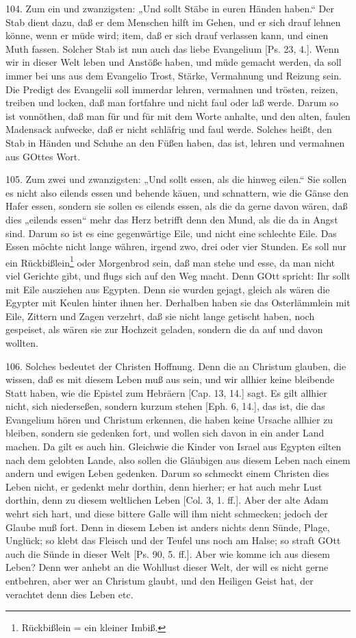 104. Zum ein und zwanzigsten: „Und sollt Stäbe in euren Händen haben.“ Der Stab dient dazu, daß er dem Menschen hilft im Gehen, und er sich drauf lehnen könne, wenn er müde wird; item, daß er sich drauf verlassen kann, und einen Muth fassen. Solcher Stab ist nun auch das liebe Evangelium [Ps. 23, 4.]. Wenn wir in dieser Welt leben und Anstöße haben, und müde gemacht werden, da soll immer bei uns aus dem Evangelio Trost, Stärke, Vermahnung und Reizung sein. Die Predigt des Evangelii soll immerdar lehren, vermahnen und trösten, reizen, treiben und locken, daß man fortfahre und nicht faul oder laß werde. Darum so ist vonnöthen, daß man für und für mit dem Worte anhalte, und den alten, faulen Madensack aufwecke, daß er nicht schläfrig und faul werde. Solches heißt, den Stab in Händen und Schuhe an den Füßen haben, das ist, lehren und vermahnen aus GOttes Wort.

105. Zum zwei und zwanzigsten: „Und sollt essen, als die hinweg eilen.“ Sie sollen es nicht also eilends essen und behende käuen, und schnattern, wie die Gänse den Hafer essen, sondern sie sollen es eilends essen, als die da gerne davon wären, daß dies „eilends essen“ mehr das Herz betrifft denn den Mund, als die da in Angst sind. Darum so ist es eine gegenwärtige Eile, und nicht eine schlechte Eile. Das Essen möchte nicht lange währen, irgend zwo, drei oder vier Stunden. Es soll nur ein Rückbißlein\footnote{Rückbißlein = ein kleiner Imbiß.} oder Morgenbrod sein, daß man stehe und esse, da man nicht viel Gerichte gibt, und flugs sich auf den Weg macht. Denn GOtt spricht: Ihr sollt mit Eile ausziehen aus Egypten. Denn sie wurden gejagt, gleich als wären die Egypter mit Keulen hinter ihnen her. Derhalben haben sie das Osterlämmlein mit Eile, Zittern und Zagen verzehrt, daß sie nicht lange getischt haben, noch gespeiset, als wären sie zur Hochzeit geladen, sondern die da auf und davon wollten.

106. Solches bedeutet der Christen Hoffnung. Denn die an Christum glauben, die wissen, daß es mit diesem Leben muß aus sein, und wir allhier keine bleibende Statt haben, wie die Epistel zum Hebräern [Cap. 13, 14.] sagt. Es gilt allhier nicht, sich niederseßen, sondern kurzum stehen [Eph. 6, 14.], das ist, die das Evangelium hören und Christum erkennen, die haben keine Ursache allhier zu bleiben, sondern sie gedenken fort, und wollen sich davon in ein ander Land machen. Da gilt es auch hin. Gleichwie die Kinder von Israel aus Egypten eilten nach dem gelobten Lande, also sollen die Gläubigen aus diesem Leben nach einem andern und ewigen Leben gedenken. Darum so schmeckt einem Christen dies Leben nicht, er gedenkt mehr dorthin, denn hierher; er hat auch mehr Lust dorthin, denn zu diesem weltlichen Leben [Col. 3, 1. ff.]. Aber der alte Adam wehrt sich hart, und diese bittere Galle will ihm nicht schmecken; jedoch der Glaube muß fort. Denn in diesem Leben ist anders nichts denn Sünde, Plage, Unglück; so klebt das Fleisch und der Teufel uns noch am Halse; so straft GOtt auch die Sünde in dieser Welt [Ps. 90, 5. ff.]. Aber wie komme ich aus diesem Leben? Denn wer anhebt an die Wohllust dieser Welt, der will es nicht gerne entbehren, aber wer an Christum glaubt, und den Heiligen Geist hat, der verachtet denn dies Leben etc.

